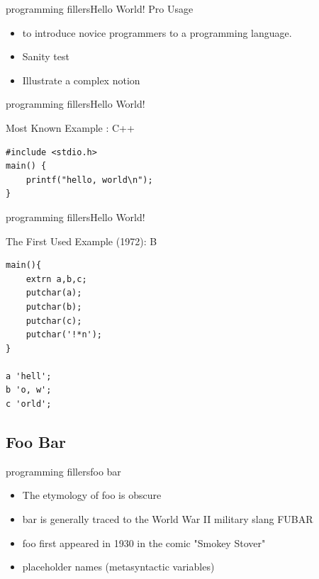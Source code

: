 \documentclass[10pt]{beamer}
\begin{document}
\begin{frame}{programming fillers}{Hello World!} 
	Pro Usage
	\begin{itemize}
		\item to introduce novice programmers to a programming language.
		\item Sanity test 
		\item Illustrate a complex notion
	\end{itemize}

\end{frame}

\begin{frame}[fragile]{programming fillers}{Hello World!} 

\begin{block}{Most Known Example : C++}
\begin{lstlisting}
#include <stdio.h>
main() {
    printf("hello, world\n");
}
\end{lstlisting}
\end{block}

\end{frame}
\begin{frame}[fragile]{programming fillers}{Hello World!} 
\begin{block}{The First Used Example (1972): B}
\begin{lstlisting}
main(){
    extrn a,b,c;
    putchar(a);
    putchar(b);
    putchar(c);
    putchar('!*n');
}

a 'hell';
b 'o, w';
c 'orld';
\end{lstlisting}
\end{block}

\end{frame}

\subsection{Foo Bar}
\begin{frame}{programming fillers}{foo bar} 
\begin{itemize}
	\item The etymology of foo is obscure
	\item bar is generally traced to the World War II military slang FUBAR
	\item foo first appeared in 1930 in the comic "Smokey Stover"
	\item placeholder names (metasyntactic variables)
\end{itemize}

\end{frame}
\end{document}
